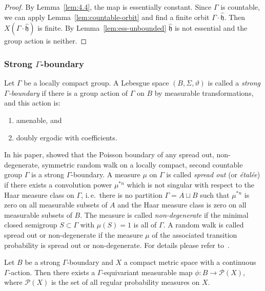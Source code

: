 \begin{proof}
  By Lemma~\ref{lem:4.4}, the map is essentially constant. Since \(\Gamma\) is countable, we can apply Lemma~\ref{lem:countable-orbit} and find a finite orbit \(\Gamma\cdot \mathfrak{\hat h}\). Then \(X(\Gamma \cdot \mathfrak{\hat h})\) is finite. By Lemma~\ref{lem:ess-unbounded} \(\mathfrak{\hat h}\) is not essential and the group action is neither.
\end{proof}

\subsubsection*{Strong \(\Gamma\)-boundary}
\label{str-bdry}

\begin{defin}
  Let \(\Gamma\) be a locally compact group. A Lebesgue space \((B, \Sigma, \vartheta)\) is called a \emph{strong \(\Gamma\)-boundary} if there is a group action of \(\Gamma\) on \(B\) by measurable transformations, and this action is:
  \begin{enumerate}
  \item amenable, and
  \item doubly ergodic with coefficients.
  \end{enumerate}
\end{defin}

\begin{bsp}
  \label{bsp:poisson}
  In his paper, \textcite[Theorem 3]{MR2006560} showed that the Poisson boundary of any spread out, non-degenerate, symmetric random walk on a locally compact, second countable group \(\Gamma\) is a strong \(\Gamma\)-boundary. A measure \(\mu\) on \(\Gamma\) is called \emph{spread out} (or \emph{étalée}) if there exists a convolution power \(\mu^{\ast n}\) which is not singular with respect to the Haar measure class on \(\Gamma\), i.\,e.\ there is no partition \(\Gamma = A \sqcup B\) such that \(\mu^{\ast n}\) is zero on all measurable subsets of \(A\) and the Haar measure class is zero on all measurable subsets of \(B\). The measure is called \emph{non-degenerate} if the minimal closed semigroup \(S \subset \Gamma\) with \(\mu(S) = 1\) is all of \(\Gamma\). A random walk is called spread out or non-degenerate if the measure \(\mu\) of the associated transition probability is spread out or non-degenerate. For details please refer to~\cite[Section 3]{MR2006560}.
\end{bsp}

\begin{thm}
  \label{thm:p(x)}
  Let \(B\) be a strong \(\Gamma\)-boundary and \(X\) a compact metric space with a continuous \(\Gamma\)-action. Then there exists a \(\Gamma\)-equivariant measurable map \(\phi \colon B \to \mathcal{P}(X)\), where \(\mathcal{P}(X)\) is the set of all regular probability measures on \(X\).
\end{thm}

